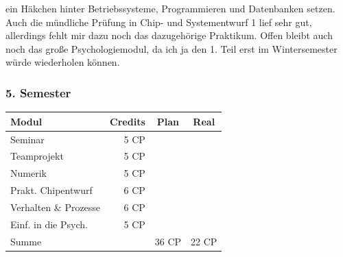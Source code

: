 ein Häkchen hinter Betriebssysteme, Programmieren und Datenbanken
setzen. Auch die mündliche Prüfung in Chip- und Systementwurf 1 lief
sehr gut, allerdings fehlt mir dazu noch das dazugehörige Praktikum. 
Offen bleibt  auch noch das
große Psychologiemodul, da ich ja den 1. Teil erst im Wintersemester
würde wiederholen können.

\subsubsection*{5. Semester}
{
\footnotesize
\begin{tabular}{|l|r|c|c|}
\hline \textbf{Modul}		& \textbf{Credits} 	& \textbf{Plan} & \textbf{Real} \\ 
\hline
\hline Seminar 				& 5 CP 				& \nx 			& 	 	\\ 
\hline Teamprojekt	 		& 5 CP 				& \nx 			& 		\\ 
\hline Numerik			 	& 5 CP 				& \nx 			& \nx 	\\ 
\hline Prakt. Chipentwurf	& 6 CP 				& \nx 			& \nx	\\ 
\hline Verhalten \& Prozesse\footnotemark[\value{footnote}]& 6 CP	& \nx 			& \nx	 	\\ 
\hline Einf. in die Psych. 	& 5 CP 				& \nx 			& \nx	\\ 
\hline
\hline Summe 				&  					& 36 CP 		& 22 CP \\ 
\hline 
\end{tabular}
}
\footnotetext[\value{footnote}]{Gesetzmäßigkeiten von Verhalten und mentalen Prozessen} 

